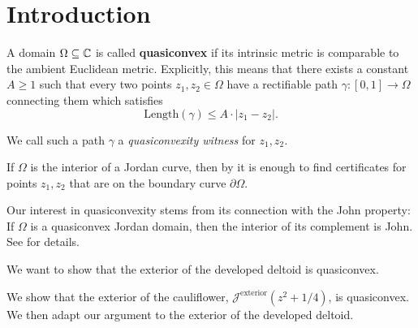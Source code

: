 


\section{Introduction}
A domain $\Omega\subseteq\mathbb{C}$ is called \textbf{quasiconvex }if its
intrinsic metric is comparable to the ambient Euclidean metric. Explicitly,
this means that there exists a constant $A\geq1$ such that every
two points $z_{1},z_{2}\in\Omega$ have a rectifiable path $\gamma:\left[0,1\right]\to\Omega$
connecting them which satisfies %
\[
\mathrm{Length}(\gamma)\leq A\cdot\left|z_{1}-z_{2}\right|.
\]

We call such a path $\gamma$ a \emph{quasiconvexity witness }for\emph{
$z_{1},z_{2}$.}%
\begin{comment}
The space $X$ is called \textbf{quasiconvex }if there is a constant
$C$ such that every pair of points $z_{1},z_{2}\in X$ can be connected
by a $C$-quasiconvex path. In other words, the intrinsic metric on
$X$ is comparable to the ambient Euclidean metric. 
\end{comment}

If $\Omega$ is the interior of a Jordan curve, then by \cite[Corollary F]{key-1}
it is enough to find certificates for points $z_{1},z_{2}$ that are
on the boundary curve $\partial\Omega$.%
\begin{comment}
It is also shown in \cite{key-1} that any quasidisk is quasiconvex.
\end{comment}

Our interest in quasiconvexity stems from its connection with the
John property: If $\Omega$ is a quasiconvex Jordan domain, then the
interior of its complement is John. See \cite[Corollary 3.4]{key-1}
for details. 

We want to show that the exterior of the developed deltoid is quasiconvex. 

We show that the exterior of the cauliflower, $\mathcal{J}^{\text{exterior}}(z^{2}+1/4)$,
is quasiconvex. We then adapt our argument to the exterior of the developed deltoid.

\begin{comment}
The Filled Julia set of $z^{2}+1/4$, called the cauliflower, has
an inward-pointing cusp and hence is not quasiconvex.
\end{comment}

\begin{comment}
Thus, for any $c$ in 

For values $c$ in quadratic polynomials $f_{c}(z)=z^{2}+c$
\end{comment}
\begin{comment}
If $f_{c}$ has an attracting fixed point then its Julia set $\mathcal{J}(f_{c})$
is a quasicircle, hence its interior and exterior are both quasiconvex.
This is the case for values of $c$ in the main cardioid of the Mandelbrot
set.
, i.e. for 
\[
c\in\left\{ -\frac{\lambda}{2}-\frac{\lambda^{2}}{4}:\,\left|\lambda\right|<1\right\} .
\]
\end{comment}

